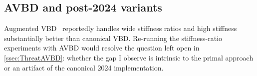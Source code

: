 \subsection{AVBD and post-2024 variants}
\label{ssec:FWAVBD}
Augmented VBD~\cite{Giles2025} reportedly handles wide stiffness ratios and high
stiffness substantially better than canonical VBD. Re-running the stiffness-ratio
experiments with AVBD would resolve the question left open in
\autoref{ssec:ThreatAVBD}: whether the gap I observe is intrinsic to the primal
approach or an artifact of the canonical 2024 implementation.
